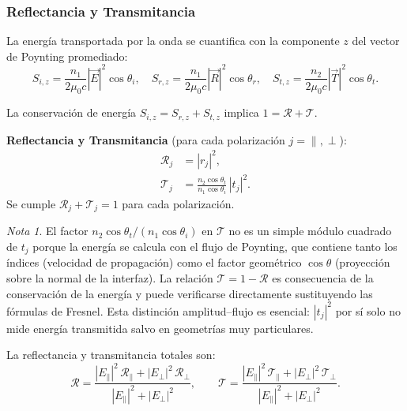 \documentclass[12pt, a4paper]{article}
\theoremstyle{plain}
\theoremstyle{definition}
\theoremstyle{remark}
\newtheorem*{nota}{Nota}
\newcommand{\ve}[1]{\vec{#1}}
\begin{document}
\subsubsection{Reflectancia y Transmitancia}

La energía transportada por la onda se cuantifica con la componente $z$ del
vector de Poynting promediado:
\[
  S_{i,z} = \frac{n_1}{2\mu_0 c}|\ve{E}|^2\cos\theta_i, \quad
  S_{r,z} = \frac{n_1}{2\mu_0 c}|\ve{R}|^2\cos\theta_r, \quad
  S_{t,z} = \frac{n_2}{2\mu_0 c}|\ve{T}|^2\cos\theta_t.
\]

La conservación de energía $S_{i,z} = S_{r,z} + S_{t,z}$ implica
$1 = \mathcal{R} + \mathcal{T}$.

\begin{mdframed}[style=resultado]
\textbf{Reflectancia y Transmitancia} (para cada polarización $j = \parallel, \perp$):
\begin{align}
  \mathcal{R}_j &= |r_j|^2,
  \label{eq:reflectancia} \\
  \mathcal{T}_j &= \frac{n_2\cos\theta_t}{n_1\cos\theta_i}\,|t_j|^2.
  \label{eq:transmitancia}
\end{align}
Se cumple $\mathcal{R}_j + \mathcal{T}_j = 1$ para cada polarización.
\end{mdframed}

\begin{nota}
El factor $n_2\cos\theta_t/(n_1\cos\theta_i)$ en $\mathcal{T}$ no es un simple
módulo cuadrado de $t_j$ porque la energía se calcula con el flujo de Poynting,
que contiene tanto los índices (velocidad de propagación) como el factor
geométrico $\cos\theta$ (proyección sobre la normal de la interfaz). La relación
$\mathcal{T} = 1-\mathcal{R}$ es consecuencia de la conservación de la energía
y puede verificarse directamente sustituyendo las fórmulas de Fresnel.
Esta distinción amplitud--flujo es esencial: $|t_j|^2$ por sí solo no mide
energía transmitida salvo en geometrías muy particulares.
\end{nota}

La reflectancia y transmitancia totales son:
\[
  \mathcal{R} = \frac{|E_\parallel|^2\,\mathcal{R}_\parallel + |E_\perp|^2\,\mathcal{R}_\perp}
                     {|E_\parallel|^2 + |E_\perp|^2},
  \qquad
  \mathcal{T} = \frac{|E_\parallel|^2\,\mathcal{T}_\parallel + |E_\perp|^2\,\mathcal{T}_\perp}
                     {|E_\parallel|^2 + |E_\perp|^2}.
\]
\end{document}
